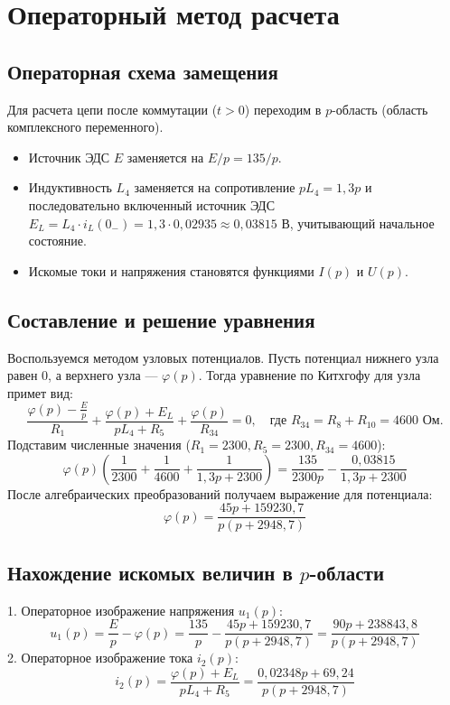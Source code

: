 \documentclass[a4paper,12pt]{article}
\begin{document}
\section{Операторный метод расчета}

\subsection{Операторная схема замещения}
Для расчета цепи после коммутации ($t > 0$) переходим в $p$-область (область комплексного переменного). 
\begin{itemize}
    \item Источник ЭДС $E$ заменяется на $E/p = 135/p$.
    \item Индуктивность $L_4$ заменяется на сопротивление $pL_4 = 1{,}3p$ и последовательно включенный источник ЭДС $E_L = L_4 \cdot i_L(0_-) = 1{,}3 \cdot 0{,}02935 \approx 0{,}03815$ В, учитывающий начальное состояние.
    \item Искомые токи и напряжения становятся функциями $I(p)$ и $U(p)$.
\end{itemize}

\subsection{Составление и решение уравнения}
Воспользуемся методом узловых потенциалов. Пусть потенциал нижнего узла равен 0, а верхнего узла — $\varphi(p)$. Тогда уравнение по Китхгофу для узла примет вид:
\begin{equation}
    \frac{\varphi(p) - \frac{E}{p}}{R_1} + \frac{\varphi(p) + E_L}{pL_4 + R_5} + \frac{\varphi(p)}{R_{34}} = 0, \quad \text{где } R_{34} = R_8 + R_{10} = 4600 \text{ Ом.}
\end{equation}
Подставим численные значения ($R_1=2300, R_5=2300, R_{34}=4600$):
\begin{equation}
    \varphi(p) \left( \frac{1}{2300} + \frac{1}{4600} + \frac{1}{1{,}3p + 2300} \right) = \frac{135}{2300p} - \frac{0{,}03815}{1{,}3p + 2300}
\end{equation}
После алгебраических преобразований получаем выражение для потенциала:
\begin{equation}
    \varphi(p) = \frac{45p + 159230{,}7}{p(p + 2948{,}7)}
\end{equation}

\subsection{Нахождение искомых величин в $p$-области}
1. Операторное изображение напряжения $u_1(p)$:
\begin{equation}
    u_1(p) = \frac{E}{p} - \varphi(p) = \frac{135}{p} - \frac{45p + 159230{,}7}{p(p + 2948{,}7)} = \frac{90p + 238843{,}8}{p(p + 2948{,}7)}
\end{equation}
2. Операторное изображение тока $i_2(p)$:
\begin{equation}
    i_2(p) = \frac{\varphi(p) + E_L}{pL_4 + R_5} = \frac{0{,}02348p + 69{,}24}{p(p + 2948{,}7)}
\end{equation}
\end{document}
